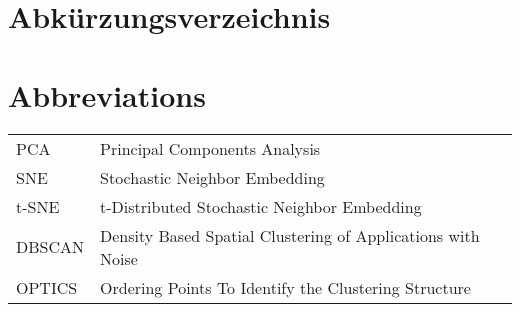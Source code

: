 \ifmmtlanguagegerman
\section*{Abkürzungsverzeichnis}
\else
\section*{Abbreviations}
\fi

\begin{table}[h]		
	\begin{tabular}{ll}
		PCA & Principal Components Analysis \\
		SNE & Stochastic Neighbor Embedding\\			
		t-SNE & t-Distributed Stochastic Neighbor Embedding\\			
		DBSCAN & Density Based Spatial Clustering of Applications with Noise\\			
		OPTICS & Ordering Points To Identify the Clustering Structure\\					
	\end{tabular}
\end{table}
